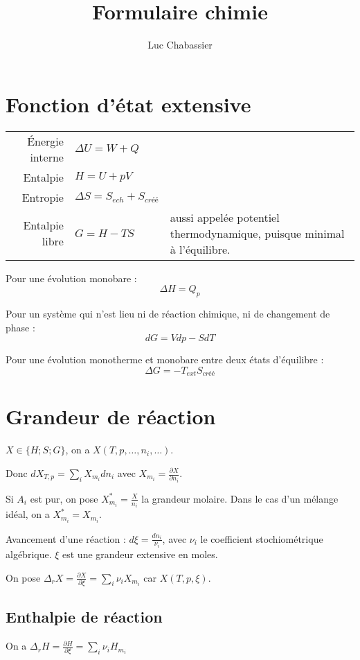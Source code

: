\documentclass[12pt,a4paper] {article}
\begin{document}
\title{Formulaire chimie}
\author{Luc Chabassier}
\maketitle

\section{Fonction d'état extensive}
\begin{tabularx}{\linewidth}{rlX}
    Énergie interne & $\Delta U = W + Q$ & \\
    Entalpie & $H = U + pV$ & \\
    Entropie & $\Delta S = S_{ech} + S_{créé}$ & \\
    Entalpie libre & $G = H - TS$ & aussi appelée potentiel thermodynamique, puisque minimal à l'équilibre. \\
\end{tabularx}

Pour une évolution monobare : \[\Delta H = Q_p\]

Pour un système qui n'est lieu ni de réaction chimique, ni de changement de phase : \[dG = Vdp - SdT\]

Pour une évolution monotherme et monobare entre deux états d'équilibre : \[\Delta G = -T_{ext}S_{créé}\]

\section{Grandeur de réaction}
$X \in \{H; S; G\}$, on a $X(T, p, \ldots, n_i, \ldots)$.

Donc $dX_{T,p} = \sum_i X_{m_i}dn_i$ avec $X_{m_i} = \frac{\partial X}{\partial n_i}$.

Si $A_i$ est pur, on pose $X_{m_i}^* = \frac{X}{n_i}$ la grandeur molaire. Dans le cas d'un mélange idéal, on a $X_{m_i}^* = X_{m_i}$.

Avancement d'une réaction : $d\xi = \frac{dn_i}{\nu_i}$, avec $\nu_i$ le coefficient stochiométrique algébrique. $\xi$ est une grandeur extensive en moles.

On pose $\Delta_r X = \frac{\partial X}{\partial \xi} = \sum_i \nu_i X_{m_i}$ car $X(T,p,\xi)$.

\subsection{Enthalpie de réaction}
On a $\Delta_r H = \frac{\partial H}{\partial \xi} = \sum_i \nu_i H_{m_i}$
\end{document}
